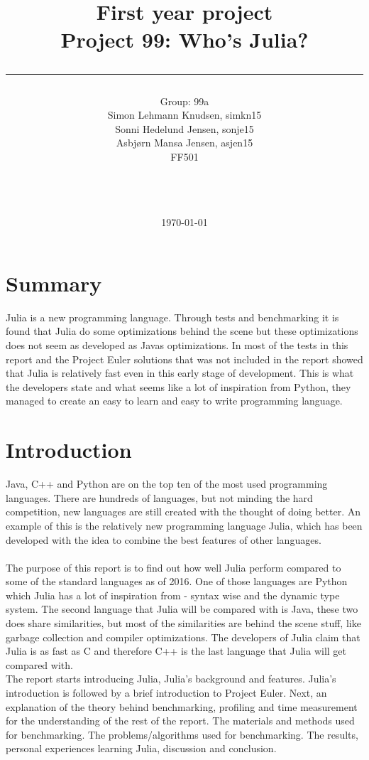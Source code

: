 \documentclass[a4paper, 11pt, titlepage]{article}
\title{First year project\\Project 99: Who's Julia?\\\rule{10cm}{0.5mm}}
\author{Group: 99a\\Simon Lehmann Knudsen, simkn15\\Sonni Hedelund Jensen, sonje15\\Asbjørn Mansa Jensen, asjen15
	\\ FF501\\\rule{5.5cm}{0.5mm}\\}
\date{\today}
\begin{document}
\maketitle

\vfill

\newpage
{}
\section{Summary}
Julia is a new programming language. Through tests and benchmarking it is found that Julia do some optimizations behind the scene but these optimizations does not seem as developed as Javas optimizations. In most of the tests in this report and the Project Euler solutions that was not included in the report showed that Julia is relatively fast even in this early stage of development. This is what the developers state and what seems like a lot of inspiration from Python, they managed to create an easy to learn and easy to write programming language.

\newpage
\tableofcontents

\newpage
{}
\pagestyle{fancy}
\fancyhf{}
\section{Introduction}
Java, C++ and Python are on the top ten of the most used programming languages. There are hundreds of languages, but not minding the hard competition, new languages are still created with the thought of doing better. An example of this is the relatively new programming language Julia, which has been developed with the idea to combine the best features of other languages.\\
\\
The purpose of this report is to find out how well Julia perform compared to some of the standard languages as of 2016. One of those languages are Python which Julia has a lot of inspiration from - syntax wise and the dynamic type system. The second language that Julia will be compared with is Java, these two does share similarities, but most of the similarities are behind the scene stuff, like garbage collection and compiler optimizations. The developers of Julia claim that Julia is as fast as C and therefore C++ is the last language that Julia will get compared with.
\\
The report starts introducing Julia, Julia's background and features. Julia's introduction is followed by a brief introduction to Project Euler. Next, an explanation of the theory behind benchmarking, profiling and time measurement for the understanding of the rest of the report. The materials and methods used for benchmarking. The problems/algorithms used for benchmarking. The results, personal experiences learning Julia, discussion and conclusion. 
\end{document}
